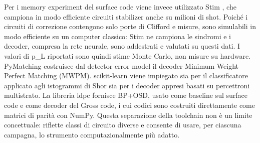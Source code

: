 Per i memory experiment del surface code viene invece utilizzato Stim \cite{stim2021}, che campiona in modo efficiente circuiti stabilizer anche su milioni di shot. Poiché i circuiti di correzione contengono solo porte di Clifford e misure, sono simulabili in modo efficiente su un computer classico: Stim ne campiona le sindromi e i decoder, compresa la rete neurale, sono addestrati e valutati su questi dati. I valori di p\_L riportati sono quindi stime Monte Carlo, non misure su hardware. PyMatching \cite{pymatching2021} costruisce dal detector error model il decoder Minimum Weight Perfect Matching (MWPM). scikit-learn \cite{scikit_learn} viene impiegato sia per il classificatore applicato agli istogrammi di Shor sia per i decoder appresi basati su percettroni multistrato. La libreria ldpc \cite{roffe2020} fornisce BP+OSD, usato come baseline sul surface code e come decoder del Gross code, i cui codici sono costruiti direttamente come matrici di parità con NumPy. Questa separazione della toolchain non è un limite concettuale: riflette classi di circuito diverse e consente di usare, per ciascuna campagna, lo strumento computazionalmente più adatto.

